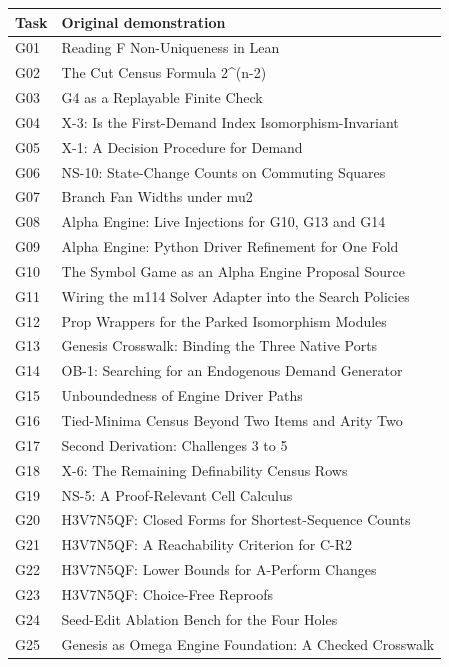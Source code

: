 \documentclass[
  11pt,
]{article}
\begin{document}
\begin{longtable}[]{@{}ll@{}}
\toprule\noalign{}
Task & Original demonstration \\
\midrule\noalign{}
\endhead
\bottomrule\noalign{}
\endlastfoot
G01 & Reading F Non-Uniqueness in Lean \\
G02 & The Cut Census Formula 2\^{}(n-2) \\
G03 & G4 as a Replayable Finite Check \\
G04 & X-3: Is the First-Demand Index Isomorphism-Invariant \\
G05 & X-1: A Decision Procedure for Demand \\
G06 & NS-10: State-Change Counts on Commuting Squares \\
G07 & Branch Fan Widths under mu2 \\
G08 & Alpha Engine: Live Injections for G10, G13 and G14 \\
G09 & Alpha Engine: Python Driver Refinement for One Fold \\
G10 & The Symbol Game as an Alpha Engine Proposal Source \\
G11 & Wiring the m114 Solver Adapter into the Search Policies \\
G12 & Prop Wrappers for the Parked Isomorphism Modules \\
G13 & Genesis Crosswalk: Binding the Three Native Ports \\
G14 & OB-1: Searching for an Endogenous Demand Generator \\
G15 & Unboundedness of Engine Driver Paths \\
G16 & Tied-Minima Census Beyond Two Items and Arity Two \\
G17 & Second Derivation: Challenges 3 to 5 \\
G18 & X-6: The Remaining Definability Census Rows \\
G19 & NS-5: A Proof-Relevant Cell Calculus \\
G20 & H3V7N5QF: Closed Forms for Shortest-Sequence Counts \\
G21 & H3V7N5QF: A Reachability Criterion for C-R2 \\
G22 & H3V7N5QF: Lower Bounds for A-Perform Changes \\
G23 & H3V7N5QF: Choice-Free Reproofs \\
G24 & Seed-Edit Ablation Bench for the Four Holes \\
G25 & Genesis as Omega Engine Foundation: A Checked Crosswalk \\
\end{longtable}
\end{document}

